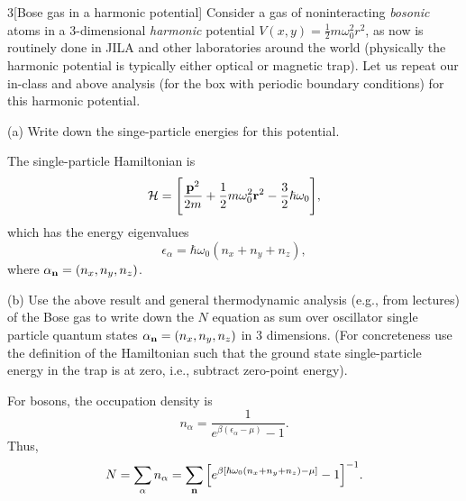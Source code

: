 \documentclass[12pt]{article}
\begin{document}
\begin{problem}{3}[Bose gas in a harmonic potential]
Consider a gas of noninteracting \textit{bosonic} atoms in a 3-dimensional
\textit{harmonic} potential $V(x,y)=\frac12m\omega_0^2r^2$, as now is routinely
done in JILA and other laboratories around the world (physically the harmonic
potential is typically either optical or magnetic trap). Let us repeat our
in-class and above analysis (for the box with periodic boundary conditions) for
this harmonic potential.

(a) Write down the singe-particle energies for this potential.
\begin{solution}
The single-particle Hamiltonian is
\begin{equation}
    \mathcal{H}=\qty[\frac{\vb{p}^2}{2m}+\frac12m\omega_0^2\vb{r}^2-\frac32\hbar\omega_0],
\end{equation}
which has the energy eigenvalues
\begin{equation}
    \epsilon_\alpha=\hbar\omega_0(n_x+n_y+n_z), 
\end{equation}
where $\alpha_{\vb{n}}=(n_x,n_y,n_z)$.
\end{solution}

(b) Use the above result and general thermodynamic analysis (e.g., from
lectures) of the Bose gas to write down the $N$ equation as sum over oscillator
single particle quantum states $\alpha_{\vb{n}}=(n_x,n_y,n_z)$ in 3 dimensions.
(For concreteness use the definition of the Hamiltonian such that the ground
state single-particle energy in the trap is at zero, i.e., subtract zero-point
energy).
\begin{solution}
For bosons, the occupation density is
\begin{equation}
    n_\alpha=\frac1{e^{\beta(\epsilon_\alpha-\mu)}-1}. 
\end{equation}
Thus,
\begin{equation}
    N=\sum_\alpha
    n_\alpha=\sum_{\vb{n}}\qty[e^{\beta[\hbar\omega_0(n_x+n_y+n_z)-\mu]}-1]^{-1}. 
\end{equation}
\end{solution}


\end{problem}
\end{document}
